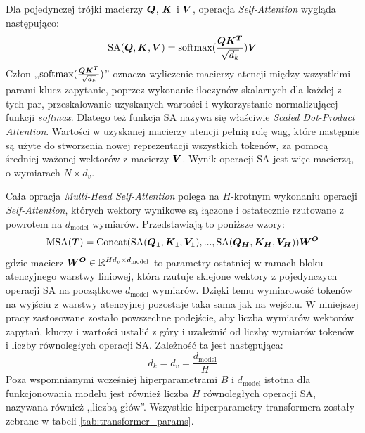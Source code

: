 Dla pojedynczej trójki macierzy $\boldsymbol{Q}$, $\boldsymbol{K}$ i $\boldsymbol{V}$, operacja
\emph{Self-Attention} wygląda następująco:
\begin{equation} \label{eq:sa}
    \textrm{SA}(\boldsymbol{Q}, \boldsymbol{K}, \boldsymbol{V}) = \textrm{softmax}(\frac{\boldsymbol{Q}\boldsymbol{K^T}}{\sqrt{d_k}})\boldsymbol{V}
\end{equation}
Człon ,,$\textrm{softmax}(\frac{\boldsymbol{Q}\boldsymbol{K^T}}{\sqrt{d_k}})$'' oznacza wyliczenie macierzy
atencji między wszystkimi parami klucz-zapytanie, poprzez wykonanie iloczynów skalarnych dla
każdej z tych par, przeskalowanie uzyskanych wartości i wykorzystanie normalizującej funkcji
\emph{softmax}. Dlatego też funkcja SA nazywa się właściwie \emph{Scaled Dot-Product Attention}.
Wartości w uzyskanej macierzy atencji pełnią rolę wag, które następnie są użyte do stworzenia
nowej reprezentacji wszystkich tokenów, za pomocą średniej ważonej wektorów z macierzy $\boldsymbol{V}$.
Wynik operacji SA jest więc macierzą, o wymiarach $N \times d_v$.

Cała opracja \emph{Multi-Head Self-Attention} polega na $H$-krotnym wykonaniu operacji
\emph{Self-Attention}, których wektory wynikowe są łączone i ostatecznie rzutowane z powrotem na
$d_{\mathrm{model}}$ wymiarów. Przedstawiają to poniższe wzory:
\begin{equation}
    \textrm{MSA}(\boldsymbol{T}) = \textrm{Concat}(\textrm{SA}(\boldsymbol{Q_1}, \boldsymbol{K_1}, \boldsymbol{V_1}), ..., \textrm{SA}(\boldsymbol{Q_H},
    \boldsymbol{K_H}, \boldsymbol{V_H}))\boldsymbol{W^O}
\end{equation}
gdzie macierz $\boldsymbol{W^O} \in \mathbb{R}^{Hd_v \times d_{\mathrm{model}}}$ to parametry ostatniej w ramach bloku
atencyjnego warstwy liniowej, która rzutuje sklejone wektory z pojedynczych operacji SA na
początkowe $d_{\mathrm{model}}$ wymiarów. Dzięki temu wymiarowość tokenów na wyjściu z warstwy
atencyjnej pozostaje taka sama jak na wejściu. W niniejszej pracy zastosowane zostało powszechne
podejście, aby liczba wymiarów wektorów zapytań, kluczy i wartości ustalić z góry i uzależnić od
liczby wymiarów tokenów i liczby równoległych operacji SA. Zależność ta jest następująca:
\begin{equation}
    d_k = d_v = \frac{d_{\mathrm{model}}}{H}
\end{equation}
Poza wspomnianymi wcześniej hiperparametrami $B$ i $d_{\mathrm{model}}$ istotna dla funkcjonowania
modelu jest również liczba $H$ równoległych operacji SA, nazywana również ,,liczbą głów''. Wszystkie
hiperparametry transformera zostały zebrane w tabeli \ref{tab:transformer_params}.

